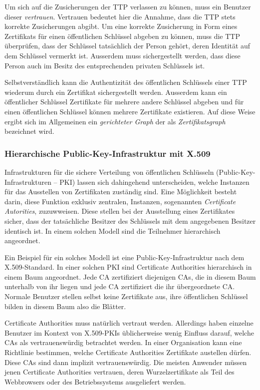 Um sich auf die Zusicherungen der TTP verlassen zu k\"onnen, muss ein
Benutzer dieser \emph{vertrauen}. Vertrauen bedeutet hier die Annahme,
dass die TTP stets korrekte Zusicherungen abgibt. Um eine korrekte
Zusicherung in Form eines Zertifikats f\"ur einen \"offentlichen
Schl\"ussel abgeben zu k\"onnen, muss die TTP \"uberpr\"ufen, dass der
Schl\"ussel tats\"achlich der Person geh\"ort, deren Identit\"at auf
dem Schl\"ussel vermerkt ist. Ausserdem muss sichergestellt werden,
dass diese Person auch im Besitz des entsprechenden privaten
Schl\"ussels ist.

Selbstverst\"andlich kann die Authentizit\"at des \"offentlichen
Schl\"ussels einer TTP wiederum durch ein Zertifikat sichergestellt
werden. Ausserdem kann ein \"offentlicher Schl\"ussel Zertifikate
f\"ur mehrere andere Schl\"ussel abgeben und f\"ur einen
\"offentlichen Schl\"ussel k\"onnen mehrere Zertifikate
existieren. Auf diese Weise ergibt sich im Allgemeinen ein
\emph{gerichteter Graph} der als \emph{Zertifikatsgraph} bezeichnet
wird.

\subsubsection{Hierarchische Public-Key-Infrastruktur mit X.509}
\label{ch:Grundlagen:sec:PublicKeyCrypto:subsec:KeyAuth:subsubsec:PKI}

Infrastrukturen f\"ur die sichere Verteilung von \"offentlichen
Schl\"usseln (Public-Key-Infrastrukturen -- PKI) lassen sich
dahingehend unterscheiden, welche Instanzen f\"ur das Ausstellen von
Zertifikaten zust\"andig sind. Eine M\"oglichkeit besteht darin, diese
Funktion exklusiv zentralen, Instanzen, sogenannten \emph{Certificate
  Autorities}, zuzuwweisen. Diese stellen bei der Ausstellung eines
Zertifikates sicher, dass der tats\"achliche Besitzer des Schl\"ussels
mit dem angegebenen Besitzer identisch ist. In einem solchen Modell
sind die Teilnehmer hierarchisch angeordnet. 

Ein Beispiel f\"ur ein solches Modell ist eine
Public-Key-Infrastruktur nach dem X.509-Standard. In einer solchen PKI
sind Certificate Authorities hierarchisch in einem Baum
angeordnet. Jede CA zertifiziert diejenigen CAs, die in diesem Baum
unterhalb von ihr liegen und jede CA zertifiziert die ihr
\"ubergeordnete CA. Normale Benutzer stellen selbst keine Zertifikate
aus, ihre \"offentlichen Schl\"ussel bilden in diesem Baum also die
Bl\"atter.

Certificate Authorities muss nat\"urlich vertraut werden. Allerdings
haben einzelne Benutzer im Kontext von X.509-PKIs \"ublicherweise
wenig Einfluss darauf, welche CAs als vertrauensw\"urdig betrachtet
werden. In einer Organisation kann eine Richtlinie bestimmen, welche
Certificate Authorities Zertifikate austellen d\"urfen. Diese CAs sind
dann implizit vertrauensw\"urdig. Die meisten Anwender m\"ussen jenen
Certificate Authorities vertrauen, deren Wurzelzertifikate als Teil
des Webbrowsers oder des Betriebssystems ausgeliefert werden.

